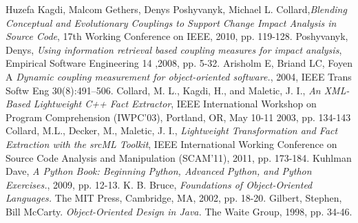 \documentclass[12pt,a4paper,oneside]{report}
\begin{document}
\begin{thebibliography}{1}
 Huzefa Kagdi, Malcom Gethers, Denys Poshyvanyk, Michael L. Collard,\emph{Blending Conceptual and Evolutionary Couplings to Support Change Impact Analysis in Source Code}, 17th Working Conference on IEEE, 2010, pp. 119-128.
Poshyvanyk, Denys, \emph{Using information retrieval based coupling measures for impact analysis}, Empirical Software Engineering 14 ,2008, pp. 5-32.
Arisholm E, Briand LC, Foyen A \emph{Dynamic coupling measurement for object-oriented software.}, 2004, IEEE Trans Softw Eng 30(8):491–506.
Collard, M. L., Kagdi, H., and Maletic, J. I., \emph{An XML-Based Lightweight C++ Fact Extractor}, IEEE International Workshop on Program Comprehension (IWPC'03), Portland, OR, May 10-11 2003, pp. 134-143
Collard, M.L., Decker, M., Maletic, J. I.,  \emph{Lightweight Transformation and Fact Extraction with the srcML Toolkit}, IEEE International Working Conference on Source Code Analysis and Manipulation (SCAM'11), 2011, pp. 173-184.
Kuhlman Dave, \emph{A Python Book: Beginning Python, Advanced Python, and Python Exercises.}, 2009, pp. 12-13.
 K. B. Bruce, \emph{ Foundations of Object-Oriented Languages.} The MIT Press, Cambridge, MA, 2002, pp. 18-20.
Gilbert, Stephen, Bill McCarty. \emph{Object-Oriented Design in Java.} The Waite Group, 1998, pp. 34-46.


\end{thebibliography}
\end{document}
